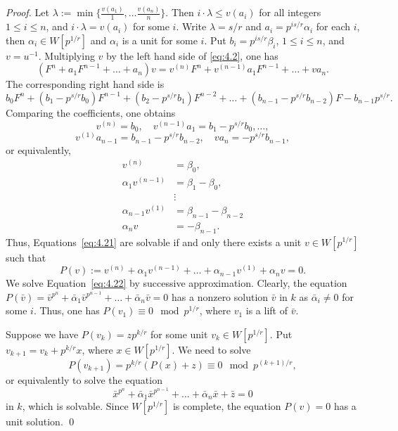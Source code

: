 \documentclass[]{amsart}
\theoremstyle{plain}
\theoremstyle{definition}
\theoremstyle{remark}
\newcommand{\<}{\langle}   %
\renewcommand{\>}{\rangle} %
\begin{document}
\begin{proof}
    Let $\lambda:=\min \{\frac{v(a_1)}{1},\dots \frac{v(a_n)}{n} \}$. Then $i\cdot \lambda\le v(a_i)$ for all integers $1\le i \le n$, and $i\cdot \lambda=v(a_i)$ for some $i$. Write $\lambda=s/r$ and $a_i= p^{is/r} \alpha_i$ for each $i$, then $\alpha_i\in W[p^{1/r}]$ and $\alpha_i$ is a unit for some $i$. Put $b_i=p^{is/r} \beta_i$, $1\le i \le n$, and $v=u^{-1}$. Multiplying $v$ by the left hand side of \eqref{eq:4.2}, one has
    \[ (F^n+a_1 F^{n-1}+\dots +a_n)v=v^{(n)} F^n+v^{(n-1)} a_1 F^{n-1} +\dots+v a_n. \]
    The corresponding right hand side is  
    \[ b_0 F^n+(b_1-p^{s/r} b_0)F^{n-1}+(b_2-p^{s/r} b_1) F^{n-2}+ \dots + (b_{n-1}-p^{s/r} b_{n-2})F-b_{n-1} p^{s/r}. \]
    Comparing the coefficients, one obtains
    \[ v^{(n)}=b_0, \quad v^{(n-1)} a_1=b_1-p^{s/r} b_0,\dots, \]
    \[ v^{(1)} a_{n-1}=b_{n-1}-p^{s/r} b_{n-2}, \quad va_n=-p^{s/r} b_{n-1},\]
    or equivalently,
    \begin{equation} \label{eq:4.21}   
     \begin{split}
        v^{(n)} &=\beta_0,\\
        \alpha_1 v^{(n-1)}& =\beta_1-\beta_0,\\
           & \vdots \\
           \alpha_{n-1} v^{(1)}&=\beta_{n-1}-\beta_{n-2}\\
           \alpha_n v&=-\beta_{n-1}.
     \end{split}
     \end{equation}
Thus, Equations~\eqref{eq:4.21} are solvable if and only there exists a unit $v\in W[p^{1/r}]$ such that 
\begin{equation}\label{eq:4.22}
   P(v):=v^{(n)}+ \alpha_1 v^{(n-1)} +\dots+\alpha_{n-1}v^{(1)}+\alpha_n v=0. 
\end{equation}
We solve Equation~\eqref{eq:4.22} by successive approximation. Clearly, the equation 
$P(\bar v)=\bar v^{p^n}+\bar \alpha_1 \bar v^{p^{n-1}}+\dots +\bar \alpha_n \bar v=0$
has a nonzero solution $\bar v$ in $k$ as $\bar \alpha_i\neq 0$ for some $i$. Thus, one has $P(v_1)\equiv 0 \mod p^{1/r}$, where $v_1$ is a lift of $\bar v$.


Suppose we have $P(v_k)=z p^{k/r}$ for some unit $v_k\in W[p^{1/r}]$.
Put $v_{k+1}=v_k+p^{k/r}x$, where $x\in W[p^{1/r}]$. We need to solve
\[ P(v_{k+1})=p^{k/r}(P(x)+z) \equiv 0 \mod p^{(k+1)/r}, \]
or equivalently to solve the equation 
\[ \bar x^{p^n}+\bar \alpha_1 \bar x^{p^{n-1}}+\dots +\bar \alpha_n \bar x +\bar z=0\]
in $k$, which is solvable. Since $W[p^{1/r}]$ is complete, the equation $P(v)=0$ has a unit solution. \qed
\end{proof}
\end{document}
